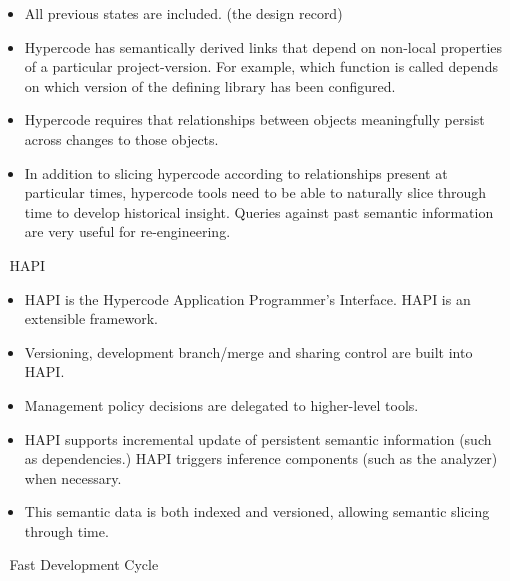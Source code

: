 \begin{itemize}
\item  All previous states are included. (the design record)

\item Hypercode has semantically derived links that depend on non-local
properties of a particular project-version.  For example, which function is
called depends on which version of the defining library has been configured.

\item Hypercode requires that relationships between objects meaningfully
persist across changes to those objects.

\item In addition to slicing hypercode according to relationships present at
particular times, hypercode tools need to be able to naturally slice through
time to develop historical insight.  Queries against past semantic information
are very useful for re-engineering.
\end{itemize}


\newpage
HAPI

\begin{itemize}
\item HAPI is the Hypercode Application Programmer's Interface.  HAPI is an
extensible framework.

\item Versioning, development branch/merge and sharing control are built into
HAPI.

\item Management policy decisions are delegated to higher-level tools.

\item HAPI supports incremental update of persistent semantic information (such
as dependencies.)  HAPI triggers inference components (such as the
analyzer) when necessary.

\item This semantic data is both indexed and versioned, allowing semantic
slicing through time.
\end{itemize}


\newpage
Fast Development Cycle

